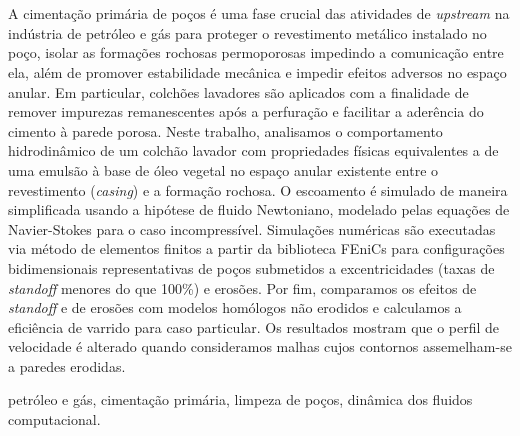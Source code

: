 \newpage

\section*{} 

\noindent
A cimentação primária de poços é uma fase crucial das atividades de \textit{upstream} na indústria de petróleo e gás para proteger o revestimento metálico instalado no poço, isolar as formações rochosas permoporosas impedindo a comunicação entre ela, além de promover estabilidade mecânica e impedir efeitos adversos no espaço anular. Em particular, colchões lavadores são aplicados com a finalidade de remover impurezas remanescentes após a perfuração e  facilitar a aderência do cimento à parede porosa. Neste trabalho, analisamos o comportamento hidrodinâmico de um colchão lavador com propriedades físicas equivalentes a de uma emulsão à base de óleo vegetal no espaço anular existente entre o revestimento (\textit{casing}) e a formação rochosa. O escoamento é simulado de maneira simplificada usando a hipótese de fluido Newtoniano, modelado pelas equações de Navier-Stokes para o caso incompressível. Simulações numéricas são executadas via método de elementos finitos a partir da biblioteca FEniCs para configurações bidimensionais representativas de poços submetidos a excentricidades (taxas de \textit{standoff} menores do que 100\%) e erosões. Por fim, comparamos os efeitos de \textit{standoff} e de erosões com modelos homólogos não erodidos e calculamos a eficiência de varrido para caso particular. Os resultados mostram que o perfil de velocidade é alterado quando consideramos malhas cujos contornos assemelham-se a paredes erodidas.

\vspace{1cm}

petróleo e gás,
cimentação primária, 
limpeza de poços, 
dinâmica dos fluidos computacional.